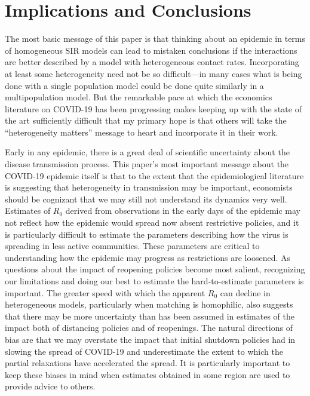 \documentclass[11pt]{article}
\begin{document}
\section{Implications and Conclusions}

The most basic message of this paper is that thinking about an epidemic in terms of homogeneous SIR models can 
lead to mistaken conclusions if the interactions are better described by a model with heterogeneous contact rates. Incorporating at least 
some heterogeneity need not be so difficult---in many cases what is being done with a single population model could 
be done quite
similarly in a multipopulation model. But the remarkable pace at which the economics literature on COVID-19 has been 
progressing makes keeping up with the state of the art sufficiently difficult that my primary hope is that others will take 
the ``heterogeneity matters'' message to heart and incorporate it in their work.

Early in any epidemic, there is a great deal of scientific uncertainty about the disease transmission process. This paper's 
most important message about the COVID-19 epidemic itself is that to the extent that the epidemiological literature is
suggesting that heterogeneity in transmission may be important, economists should be cognizant that we may still not understand its dynamics very well.
Estimates of $R_0$ derived from observations in the early days of the epidemic may not reflect how the epidemic would
spread now absent restrictive policies, and it is particularly difficult to estimate the parameters describing how the
virus is spreading in less active communities. These parameters are critical to understanding how the epidemic may progress
as restrictions are loosened. As questions about the impact of reopening policies become most salient, recognizing
our limitations and doing our best to estimate the hard-to-estimate parameters is important. The greater speed with which
the apparent $R_0$ can decline in heterogeneous models, particularly when matching is homophilic, also suggests that there may be more uncertainty than has been
assumed in estimates of the impact both of distancing policies and of reopenings. The natural directions of bias are that
we may overstate the impact that initial shutdown policies had in slowing the spread of COVID-19 and underestimate the 
extent to which the partial relaxations have accelerated the spread. It is particularly important to keep these biases in mind
when estimates obtained in some region are used to provide advice to others.
\end{document}

